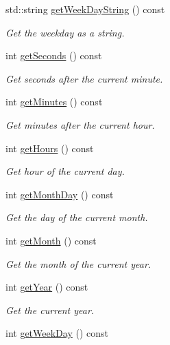 \begin{DoxyCompactItemize}
std\+::string \mbox{\hyperlink{classec_1_1_system_time_af7d3658fa0d222aae412f3c2131cb981}{get\+Week\+Day\+String}} () const
\begin{DoxyCompactList}\small\item\em Get the weekday as a string. \end{DoxyCompactList}\item 
int \mbox{\hyperlink{classec_1_1_system_time_a3064731f7779c06311e13af84ad9d6d9}{get\+Seconds}} () const
\begin{DoxyCompactList}\small\item\em Get seconds after the current minute. \end{DoxyCompactList}\item 
int \mbox{\hyperlink{classec_1_1_system_time_a4eb52bc27f4a71111ac04cbc1fe882e0}{get\+Minutes}} () const
\begin{DoxyCompactList}\small\item\em Get minutes after the current hour. \end{DoxyCompactList}\item 
int \mbox{\hyperlink{classec_1_1_system_time_a3faf36ab354c3dd42f8039123c5d2271}{get\+Hours}} () const
\begin{DoxyCompactList}\small\item\em Get hour of the current day. \end{DoxyCompactList}\item 
int \mbox{\hyperlink{classec_1_1_system_time_a4bcf3a5e2d09489469e95c4434dd1332}{get\+Month\+Day}} () const
\begin{DoxyCompactList}\small\item\em Get the day of the current month. \end{DoxyCompactList}\item 
int \mbox{\hyperlink{classec_1_1_system_time_a9460794471a501cf7a0832bea982a0a2}{get\+Month}} () const
\begin{DoxyCompactList}\small\item\em Get the month of the current year. \end{DoxyCompactList}\item 
int \mbox{\hyperlink{classec_1_1_system_time_a7e79f025f0cff0266f96109db2478974}{get\+Year}} () const
\begin{DoxyCompactList}\small\item\em Get the current year. \end{DoxyCompactList}\item 
int \mbox{\hyperlink{classec_1_1_system_time_adba0a134cb5e208f98cdba4da6cde675}{get\+Week\+Day}} () const

\end{DoxyCompactItemize}

